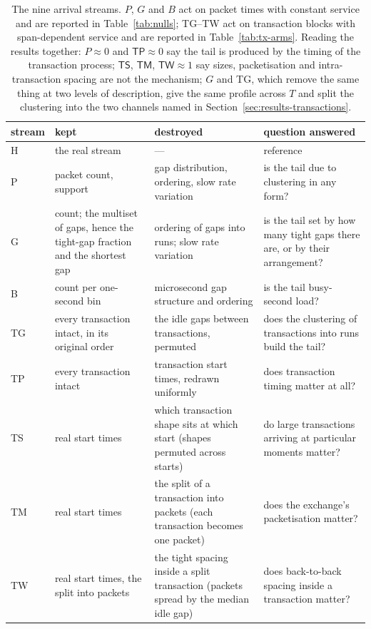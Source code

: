 \documentclass[11pt]{article}
\begin{document}
\begin{table}[tbp]
\centering
\small
\begin{tabular}{@{}l >{\raggedright\arraybackslash}p{5.2cm} >{\raggedright\arraybackslash}p{4.3cm} >{\raggedright\arraybackslash}p{4.6cm}@{}}
\toprule
stream & kept & destroyed & question answered \\
\midrule
H  & the real stream & --- & reference \\
\midrule
P  & packet count, support & gap distribution, ordering, slow rate variation & is the tail due to clustering in any form? \\
G  & count; the multiset of gaps, hence the tight-gap fraction and the shortest gap & ordering of gaps into runs; slow rate variation & is the tail set by how many tight gaps there are, or by their arrangement? \\
B  & count per one-second bin & microsecond gap structure and ordering & is the tail busy-second load? \\
\midrule
TG & every transaction intact, in its original order & the idle gaps between transactions, permuted & does the clustering of transactions into runs build the tail? \\
TP & every transaction intact & transaction start times, redrawn uniformly & does transaction timing matter at all? \\
TS & real start times & which transaction shape sits at which start (shapes permuted across starts) & do large transactions arriving at particular moments matter? \\
TM & real start times & the split of a transaction into packets (each transaction becomes one packet) & does the exchange's packetisation matter? \\
TW & real start times, the split into packets & the tight spacing inside a split transaction (packets spread by the median idle gap) & does back-to-back spacing inside a transaction matter? \\
\bottomrule
\end{tabular}
\caption{The nine arrival streams. $P$, $G$ and $B$ act on packet times with constant
service and are reported in Table~\ref{tab:nulls}; \textsf{TG}--\textsf{TW} act on transaction blocks
with span-dependent service and are reported in Table~\ref{tab:tx-arms}. Reading the
results together: $P \approx 0$ and $\textsf{TP} \approx 0$ say the tail is produced by the timing of the
transaction process; $\textsf{TS}$, $\textsf{TM}$, $\textsf{TW} \approx 1$ say sizes, packetisation and
intra-transaction spacing are not the mechanism; $G$ and \textsf{TG}, which remove the same
thing at two levels of description, give the same profile across $T$ and split the
clustering into the two channels named in Section~\ref{sec:results-transactions}.}
\label{tab:null-design}
\end{table}
\end{document}
